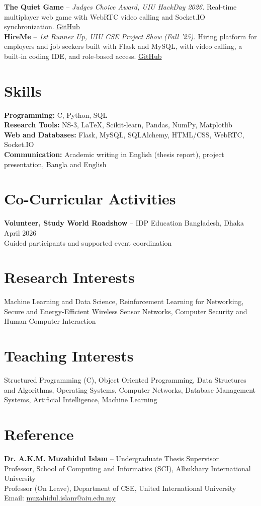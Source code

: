\documentclass[10pt,a4paper]{article}
\begin{document}
\textbf{The Quiet Game} -- \textit{Judges Choice Award, UIU HackDay 2026.} Real-time multiplayer web game with WebRTC video calling and Socket.IO synchronization. \href{https://github.com/Knocktern/The-Quiet-Game}{GitHub} \\
\textbf{HireMe} -- \textit{1st Runner Up, UIU CSE Project Show (Fall '25).} Hiring platform for employers and job seekers built with Flask and MySQL, with video calling, a built-in coding IDE, and role-based access. \href{https://github.com/Knocktern/HireMe}{GitHub}

\section*{Skills}

\textbf{Programming:} C, Python, SQL \\
\textbf{Research Tools:} NS-3, LaTeX, Scikit-learn, Pandas, NumPy, Matplotlib \\
\textbf{Web and Databases:} Flask, MySQL, SQLAlchemy, HTML/CSS, WebRTC, Socket.IO \\
\textbf{Communication:} Academic writing in English (thesis report), project presentation, Bangla and English

\section*{Co-Curricular Activities}

\textbf{Volunteer, Study World Roadshow} -- IDP Education Bangladesh, Dhaka \hfill April 2026 \\
Guided participants and supported event coordination

\section*{Research Interests}

Machine Learning and Data Science, Reinforcement Learning for Networking, Secure and Energy-Efficient Wireless Sensor Networks, Computer Security and Human-Computer Interaction

\section*{Teaching Interests}

Structured Programming (C), Object Oriented Programming, Data Structures and Algorithms, Operating Systems, Computer Networks, Database Management Systems, Artificial Intelligence, Machine Learning

\section*{Reference}

\textbf{Dr. A.K.M. Muzahidul Islam} -- Undergraduate Thesis Supervisor \\
Professor, School of Computing and Informatics (SCI), Albukhary International University \\
Professor (On Leave), Department of CSE, United International University \\
Email: \href{mailto:muzahidul.islam@aiu.edu.my}{muzahidul.islam@aiu.edu.my}
\end{document}

